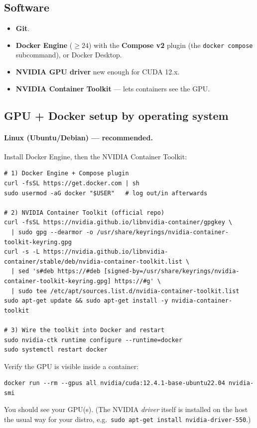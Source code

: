 \documentclass[11pt,a4paper]{article}
\newcommand{\code}[1]{\texttt{\small #1}}
\begin{document}
\subsection{Software}
\begin{itemize}[leftmargin=1.4em,itemsep=2pt]
  \item \textbf{Git}.
  \item \textbf{Docker Engine} ($\ge 24$) with the \textbf{Compose v2} plugin
        (the \code{docker compose} subcommand), or Docker Desktop.
  \item \textbf{NVIDIA GPU driver} new enough for CUDA 12.x.
  \item \textbf{NVIDIA Container Toolkit} --- lets containers see the GPU.
\end{itemize}

\subsection{GPU + Docker setup by operating system}

\paragraph{Linux (Ubuntu/Debian) --- recommended.}
Install Docker Engine, then the NVIDIA Container Toolkit:
\begin{lstlisting}
# 1) Docker Engine + Compose plugin
curl -fsSL https://get.docker.com | sh
sudo usermod -aG docker "$USER"   # log out/in afterwards

# 2) NVIDIA Container Toolkit (official repo)
curl -fsSL https://nvidia.github.io/libnvidia-container/gpgkey \
  | sudo gpg --dearmor -o /usr/share/keyrings/nvidia-container-toolkit-keyring.gpg
curl -s -L https://nvidia.github.io/libnvidia-container/stable/deb/nvidia-container-toolkit.list \
  | sed 's#deb https://#deb [signed-by=/usr/share/keyrings/nvidia-container-toolkit-keyring.gpg] https://#g' \
  | sudo tee /etc/apt/sources.list.d/nvidia-container-toolkit.list
sudo apt-get update && sudo apt-get install -y nvidia-container-toolkit

# 3) Wire the toolkit into Docker and restart
sudo nvidia-ctk runtime configure --runtime=docker
sudo systemctl restart docker
\end{lstlisting}
Verify the GPU is visible inside a container:
\begin{lstlisting}
docker run --rm --gpus all nvidia/cuda:12.4.1-base-ubuntu22.04 nvidia-smi
\end{lstlisting}
You should see your GPU(s). (The NVIDIA \emph{driver} itself is installed on the
host the usual way for your distro, e.g.\ \code{sudo apt-get install nvidia-driver-550}.)
\end{document}

